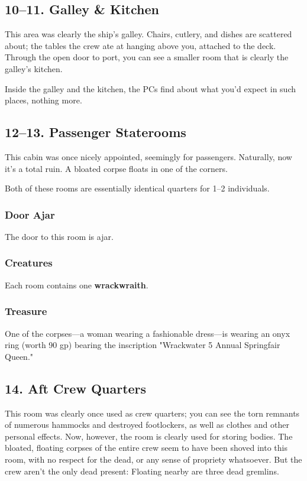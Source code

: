 \documentclass[10pt,a4paper,twoside,bg=print,twocolumn,openany,nodeprecatedcode]{dndbook}
\begin{document}
\subsection{10–11. Galley \& Kitchen}
\begin{DndReadAloud}{}
This area was clearly the ship's galley. Chairs, cutlery, and dishes are scattered about; the tables the crew ate at hanging above you, attached to the deck. Through the open door to port, you can see a smaller room that is clearly the galley's kitchen.

\end{DndReadAloud}

Inside the galley and the kitchen, the PCs find about what you'd expect in such places, nothing more.

\subsection{12–13. Passenger Staterooms}
\begin{DndReadAloud}{}
This cabin was once nicely appointed, seemingly for passengers. Naturally, now it's a total ruin. A bloated corpse floats in one of the corners.

\end{DndReadAloud}

Both of these rooms are essentially identical quarters for 1–2 individuals.

\subsubsection{Door Ajar}
The door to this room is ajar.

\subsubsection{Creatures}
Each room contains one \textbf{wrackwraith}.

\subsubsection{Treasure}
One of the corpses—a woman wearing a fashionable dress—is wearing an onyx ring (worth 90 gp) bearing the inscription "Wrackwater 5 Annual Springfair Queen."

\subsection{14. Aft Crew Quarters}
\begin{DndReadAloud}{}
This room was clearly once used as crew quarters; you can see the torn remnants of numerous hammocks and destroyed footlockers, as well as clothes and other personal effects. Now, however, the room is clearly used for storing bodies. The bloated, floating corpses of the entire crew seem to have been shoved into this room, with no respect for the dead, or any sense of propriety whatsoever. But the crew aren't the only dead present: Floating nearby are three dead gremlins.

\end{DndReadAloud}
\end{document}
